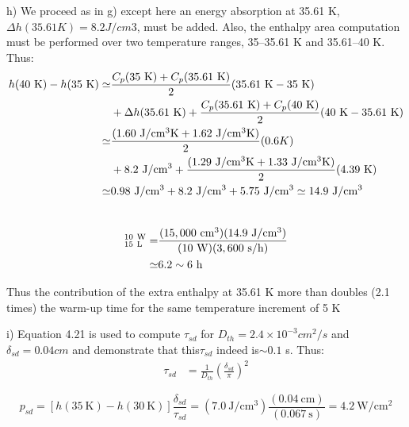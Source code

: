 h) We proceed as in g) except here an energy absorption at 35.61 K, $\Delta h(35.61 K)=8.2 J/cm3$, must be added. Also, the enthalpy area computation must be performed over two temperature ranges, 35–35.61 K and 35.61–40 K. Thus:
\begin{align*}%
h(40\ \mathrm{K})-h(35\ \mathrm{K})\simeq&\frac{C_p(35\ \mathrm{K})+C_p(35.61\ \mathrm{K})}{2}(35.61\ \mathrm{K}-35\ \mathrm{K}) \\\notag
&+\Delta h(35.61\ \mathrm{K})+\frac{C_p(35.61\ \mathrm{K})+C_p(40\ \mathrm{K})}{2}(40\ \mathrm{K}-35.61\ \mathrm{K})\\\notag
\simeq&\frac{(1.60\ \mathrm{J/cm^3 K}+1.62\ \mathrm{J/cm^3 K})}{2}(0.6K)\\\notag
&+8.2\ \mathrm{J/cm^3}+\frac{(1.29\ \mathrm{J/cm^3 K}+1.33\ \mathrm{J/cm^3 K})}{2}(4.39\ \mathrm{K})\\\notag
\simeq&0.98\ \mathrm{J/cm^3}+8.2\ \mathrm{J/cm^3}+5.75\ \mathrm{J/cm^3}\simeq 14.9\ \mathrm{J/cm^3}\\\notag
\end{align*}

\begin{align*}
[\Delta t(30\ \mathrm{K} \rightarrow 35\ \mathrm{K})]_{15\ \mathrm{L}}^{10\ \mathrm{W}}=&\frac{(15,000\ \mathrm{cm^3})(14.9\ \mathrm{J/cm^3})}{(10\ \mathrm{W})(3,600\ \mathrm{s/h})}\\\notag
\simeq&6.2\sim 6\ \mathrm{h} \notag
\end{align*}

Thus the contribution of the extra enthalpy at 35.61 K more than doubles (2.1
times) the warm-up time for the same temperature increment of 5 K

i) Equation 4.21 is used to compute $\tau_{sd}$ for $D_{th} = 2.4\times 10^{−3} cm^2/s$ and $\delta_{sd}=0.04 cm$ and demonstrate that this$\tau_{sd}$ indeed is$\sim 0.1$ s. Thus:
\begin{align}%
\tau_{sd}&=\frac{1}{D_{th}}(\frac{\delta_{sd}}{\pi})^2
\end{align}


\begin{equation*}%
p_{sd}=[h(35\ \mathrm{K})-h(30\ \mathrm{K})]\frac{\delta_{sd}}{\tau_{sd}}
=(7.0\ \mathrm{J/cm^3})\frac{(0.04\ \mathrm{cm})}{(0.067\ \mathrm{s})}=4.2 \ \mathrm{W/cm^2}
\end{equation*}



